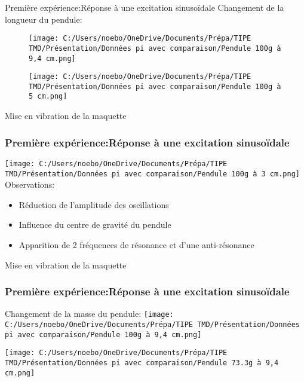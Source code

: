 \documentclass{beamer}
\begin{document}
	
	\begin{frame}{Première expérience:Réponse à une excitation sinusoïdale}
	Changement de la longueur du pendule:

		
		\begin{figure}
		\centering
		\texttt{[image: C:/Users/noebo/OneDrive/Documents/Prépa/TIPE TMD/Présentation/Données pi avec comparaison/Pendule 100g à 9,4 cm.png]}
		
		
		\centering
		\texttt{[image: C:/Users/noebo/OneDrive/Documents/Prépa/TIPE TMD/Présentation/Données pi avec comparaison/Pendule 100g à 5 cm.png]}
		\end{figure}
	\end{frame}
	
	\begin{frame}{Mise en vibration de la maquette}
		\frametitle{Première expérience:Réponse à une excitation sinusoïdale}
		\centering
		\texttt{[image: C:/Users/noebo/OneDrive/Documents/Prépa/TIPE TMD/Présentation/Données pi avec comparaison/Pendule 100g à 3 cm.png]}
		\\
		\vspace{12pt}
		Observations:
		\begin{itemize}
			\item Réduction de l'amplitude des oscillations
			\item Influence du centre de gravité du pendule
			\item Apparition de 2 fréquences de résonance et d'une anti-résonance  
		\end{itemize}
		
	\end{frame}


	
	\begin{frame}{Mise en vibration de la maquette}
		\frametitle{Première expérience:Réponse à une excitation sinusoïdale}	
		Changement de la masse du pendule:
		\centering
		\texttt{[image: C:/Users/noebo/OneDrive/Documents/Prépa/TIPE TMD/Présentation/Données pi avec comparaison/Pendule 100g à 9,4 cm.png]}
		
		
		\centering
		\texttt{[image: C:/Users/noebo/OneDrive/Documents/Prépa/TIPE TMD/Présentation/Données pi avec comparaison/Pendule 73.3g à 9,4 cm.png]}
		
		
	\end{frame}
	
	
	
\end{document}
